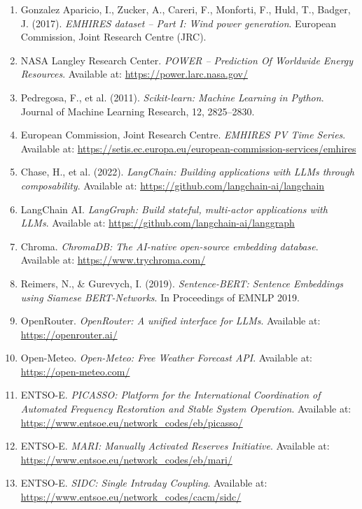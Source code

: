 \documentclass[12pt, a4paper]{article}
\begin{document}
\begin{enumerate}[noitemsep]
    \item Gonzalez Aparicio, I., Zucker, A., Careri, F., Monforti, F., Huld, T., Badger, J. (2017). \textit{EMHIRES dataset -- Part I: Wind power generation}. European Commission, Joint Research Centre (JRC).
    \item NASA Langley Research Center. \textit{POWER -- Prediction Of Worldwide Energy Resources}. Available at: \url{https://power.larc.nasa.gov/}
    \item Pedregosa, F., et al. (2011). \textit{Scikit-learn: Machine Learning in Python}. Journal of Machine Learning Research, 12, 2825--2830.
    \item European Commission, Joint Research Centre. \textit{EMHIRES PV Time Series}. Available at: \url{https://setis.ec.europa.eu/european-commission-services/emhires}
    \item Chase, H., et al. (2022). \textit{LangChain: Building applications with LLMs through composability}. Available at: \url{https://github.com/langchain-ai/langchain}
    \item LangChain AI. \textit{LangGraph: Build stateful, multi-actor applications with LLMs}. Available at: \url{https://github.com/langchain-ai/langgraph}
    \item Chroma. \textit{ChromaDB: The AI-native open-source embedding database}. Available at: \url{https://www.trychroma.com/}
    \item Reimers, N., \& Gurevych, I. (2019). \textit{Sentence-BERT: Sentence Embeddings using Siamese BERT-Networks}. In Proceedings of EMNLP 2019.
    \item OpenRouter. \textit{OpenRouter: A unified interface for LLMs}. Available at: \url{https://openrouter.ai/}
    \item Open-Meteo. \textit{Open-Meteo: Free Weather Forecast API}. Available at: \url{https://open-meteo.com/}
    \item ENTSO-E. \textit{PICASSO: Platform for the International Coordination of Automated Frequency Restoration and Stable System Operation}. Available at: \url{https://www.entsoe.eu/network_codes/eb/picasso/}
    \item ENTSO-E. \textit{MARI: Manually Activated Reserves Initiative}. Available at: \url{https://www.entsoe.eu/network_codes/eb/mari/}
    \item ENTSO-E. \textit{SIDC: Single Intraday Coupling}. Available at: \url{https://www.entsoe.eu/network_codes/cacm/sidc/}
\end{enumerate}
\end{document}
